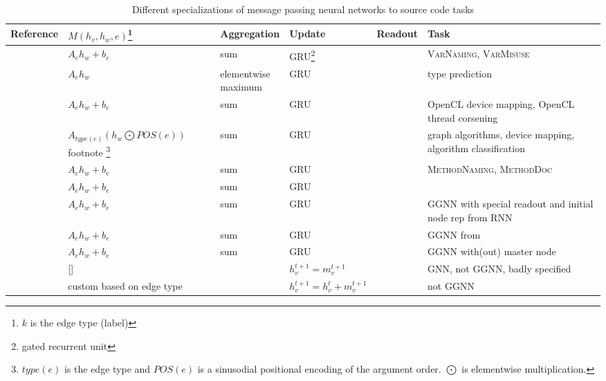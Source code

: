 \documentclass[sigconf,authordraft=true,nonacm=true]{acmart}
\begin{document}
\begin{table*}[t]
  \begin{minipage}{\textwidth}
    \begin{tabularx}{\textwidth}{llXXXX}
      \toprule
      Reference                              & $M(h_{v},h_{w},e)$\footnote{$k$ is the edge type (label)} & Aggregation & Update & Readout & Task \\ \midrule
      \citet{allamanis_learning_2018}        & $A_{e}h_{w} + b_{e}$ & sum & GRU\footnote{gated recurrent unit\cite{cho_learning_2014}} & & \textsc{VarNaming}, \textsc{VarMisuse}  \\
      \citet{allamanis_typilus_2020}         & $A_{e}h_{w}$ & \makecell{elementwise\\ maximum} & GRU & & type prediction \\
      \citet{brauckmann_compiler-based_2020} & $A_{e}h_{w} + b_{e}$ & sum & GRU & & OpenCL device mapping, OpenCL thread corsening \\
      \citet{cummins_programl_2020}          & \makecell{ $A_{type(e)}(h_{w} \bigodot POS(e))$ \\ footnote \footnote{$type(e)$ is the edge type and $POS(e)$ is a sinusodial positional encoding of the argument order. $\bigodot$ is elementwise multiplication.}} & sum & GRU & & graph algorithms, device mapping, algorithm classification \\
      \citet{fernandes_structured_2020}      & $A_{e}h_{w} + b_{e}$ & sum & GRU & & \textsc{MethodNaming}, \textsc{MethodDoc} \\
      \citet{hellendoorn_are_2019}           & $A_{e}h_{w} + b_{e}$ & sum & GRU & & \\
      \citet{hellendoorn_global_2019}        & $A_{e}h_{w} + b_{e}$ & sum & GRU & & GGNN with special readout and initial node rep from RNN\\
      \citet{li_using_2019}                  & $A_{e}h_{w} + b_{e}$ & sum & GRU & & GGNN from \cite{allamanis_learning_2018} \\
      \citet{schrouff_inferring_2019}        & $A_{e}h_{w} + b_{e}$ & sum & GRU & & GGNN with(out) master node \\
      \citet{si_learning_2018}               & [] & & $h^{t+1}_{v} = m^{t+1}_{v}$ & & GNN, not GGNN, badly specified \\
      \citet{wei_lambdanet_2020}             & custom based on edge type & & $h^{t+1}_{v} = h^{t}_{v} + m^{t+1}_{v}$ & & not GGNN

    \end{tabularx}
  \end{minipage}

  \caption{Different specializations of message passing neural networks to source code tasks}\label{fig:mpnn-applications}
\end{table*}
\end{document}
